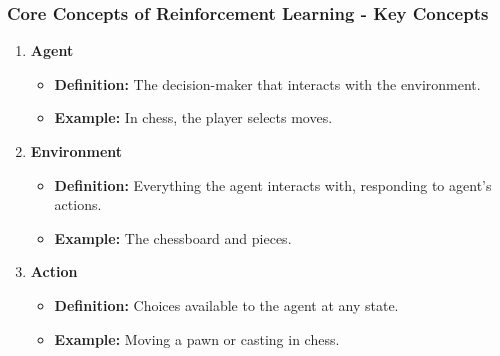 \documentclass[aspectratio=169]{beamer}
\begin{document}
\begin{frame}[fragile]
    \frametitle{Core Concepts of Reinforcement Learning - Key Concepts}
    \begin{enumerate}
        \item \textbf{Agent}
        \begin{itemize}
            \item \textbf{Definition:} The decision-maker that interacts with the environment.
            \item \textbf{Example:} In chess, the player selects moves.
        \end{itemize}
        
        \item \textbf{Environment}
        \begin{itemize}
            \item \textbf{Definition:} Everything the agent interacts with, responding to agent's actions.
            \item \textbf{Example:} The chessboard and pieces.
        \end{itemize}
        
        \item \textbf{Action}
        \begin{itemize}
            \item \textbf{Definition:} Choices available to the agent at any state.
            \item \textbf{Example:} Moving a pawn or casting in chess.
        \end{itemize}
    \end{enumerate}
\end{frame}
\end{document}
